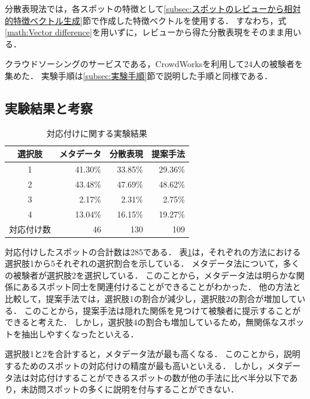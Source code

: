 \documentclass[submit]{ipsj}
\begin{document}
分散表現法では，各スポットの特徴として\ref{subsec:スポットのレビューから相対的特徴ベクトル生成}節で作成した特徴ベクトルを使用する．
すなわち，式\ref{math:Vector difference}を用いずに，レビューから得た分散表現をそのまま用いる．

クラウドソーシングのサービスである，CrowdWorksを利用して24人の被験者を集めた．
実験手順は\ref{subsec:実験手順}節で説明した手順と同様である．

\subsection{実験結果と考察}

\begin{table}[t]
  \caption{対応付けに関する実験結果}
  \label{table:対応付けに関する実験結果}
  \centering
  \begin{tabular}{c|r|r|r}
  \hline \hline
  選択肢 & \multicolumn{1}{c|}{メタデータ} & \multicolumn{1}{c|}{分散表現} & \multicolumn{1}{c}{提案手法} \\ \hline
  1  & 41.30\%                    & 33.85\%                    & 29.36\% \\
  2  & 43.48\%                    & 47.69\%                    & 48.62\% \\
  3  & 2.17\%                     & 2.31\%                     & 2.75\% \\
  4  & 13.04\%                    & 16.15\%                    & 19.27\% \\
  \hline
  対応付け数  & 46                    & 130                    & 109 \\
   \hline
  \end{tabular}
\end{table}

対応付けしたスポットの合計数は285である．
表\ref{table:対応付けに関する実験結果}は，それぞれの方法における選択肢1から5それぞれの選択割合を示している．
メタデータ法について，多くの被験者が選択肢2を選択している．
このことから，メタデータ法は明らかな関係にあるスポット同士を関連付けることができることがわかった．
他の方法と比較して，提案手法では，選択肢1の割合が減少し，選択肢2の割合が増加している．
このことから，提案手法は隠れた関係を見つけて被験者に提示することができると考えた．
しかし，選択肢4の割合も増加しているため，無関係なスポットを抽出しやすくなったといえる．

選択肢1と2を合計すると，メタデータ法が最も高くなる．
このことから，説明するためのスポットの対応付けの精度が最も高いといえる．
しかし，メタデータ法は対応付けすることができるスポットの数が他の手法に比べ半分以下であり，未訪問スポットの多くに説明を付与することができない．
\end{document}
